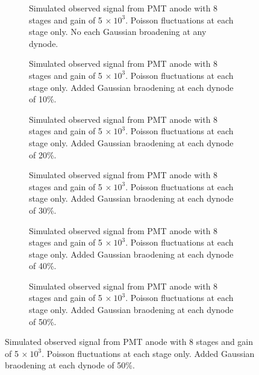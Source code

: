 \begin{figure}
\centering
\begin{subfigure}[b]{0.44\textwidth}
\caption{Simulated observed signal from PMT anode with 8 stages and gain of 5 $\times \ 10^3$. Poisson fluctuations at each stage only. No each Gaussian broadening at any dynode.}
\end{subfigure}
\hspace{3mm}
\begin{subfigure}[b]{0.44\textwidth}
\caption{Simulated observed signal from PMT anode with 8 stages and gain of 5 $\times \ 10^3$. Poisson fluctuations at each stage only. Added Gaussian braodening at each dynode of 10\%.}
\end{subfigure}

\vspace{3mm}

\begin{subfigure}[b]{0.44\textwidth}
\caption{Simulated observed signal from PMT anode with 8 stages and gain of 5 $\times \ 10^3$. Poisson fluctuations at each stage only. Added Gaussian braodening at each dynode of 20\%.}
\end{subfigure}
\hspace{3mm}
\begin{subfigure}[b]{0.44\textwidth}
\caption{Simulated observed signal from PMT anode with 8 stages and gain of 5 $\times \ 10^3$. Poisson fluctuations at each stage only. Added Gaussian braodening at each dynode of 30\%.}
\end{subfigure}

\vspace{3mm}

\begin{subfigure}[b]{0.44\textwidth}
\caption{Simulated observed signal from PMT anode with 8 stages and gain of 5 $\times \ 10^3$. Poisson fluctuations at each stage only. Added Gaussian braodening at each dynode of 40\%.}
\end{subfigure}
\hspace{3mm}
\begin{subfigure}[b]{0.44\textwidth}
\caption{Simulated observed signal from PMT anode with 8 stages and gain of 5 $\times \ 10^3$. Poisson fluctuations at each stage only. Added Gaussian braodening at each dynode of 50\%.}
\end{subfigure}
\end{figure}

